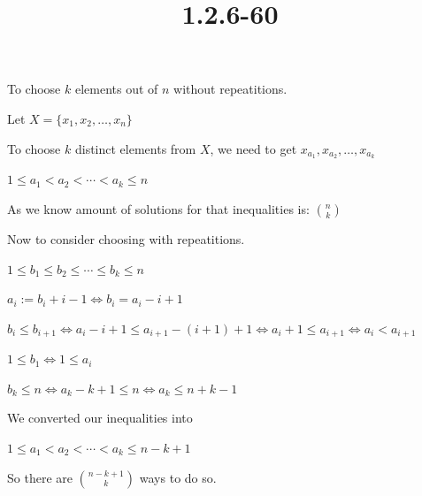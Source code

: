 \documentclass{article}
\title{1.2.6-60}
\begin{document}
\maketitle

To choose \( k \) elements out of \( n \) without repeatitions.

Let \( X = \{ x_1, x_2, \ldots, x_n \} \)

To choose \( k \) distinct elements from \( X \), we need to get \( x_{a_1}, x_{a_2}, \ldots, x_{a_k} \)

\( 1 \leq a_1 < a_2 < \cdots < a_k \leq n \)

As we know amount of solutions for that inequalities is: \( \binom{n}{k} \)

Now to consider choosing with repeatitions.

\( 1 \leq b_1 \leq b_2 \leq \cdots \leq b_k \leq n \)

\( a_i := b_i + i - 1 \iff b_i = a_i - i + 1 \)

\( b_i \leq b_{i+1} \iff a_i - i + 1 \leq a_{i+1} - (i+1) + 1 \iff a_{i} + 1 \leq a_{i+1} \iff a_i < a_{i+1} \)

\( 1 \leq b_1 \iff 1 \leq a_i \)

\( b_k \leq n \iff a_k - k + 1 \leq n \iff a_k \leq n + k - 1 \)

We converted our inequalities into

\( 1 \leq a_1 < a_2 < \cdots < a_k \leq n - k + 1 \)

So there are \( \binom{n-k+1}{k} \) ways to do so.
\end{document}
